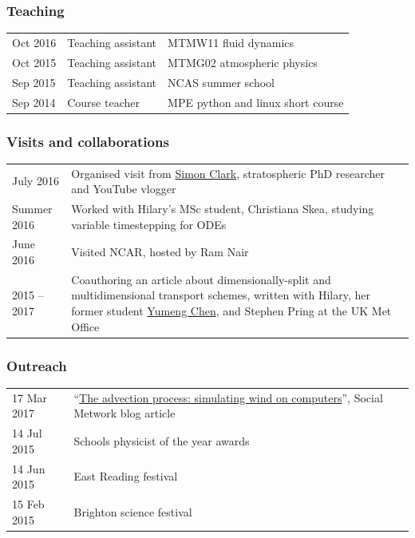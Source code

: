\documentclass[a4paper,11pt]{article}
\begin{document}
\subsubsection*{Teaching}
\begin{tabular}{l l l}
Oct 2016 & Teaching assistant & MTMW11 fluid dynamics \\
Oct 2015 & Teaching assistant & MTMG02 atmospheric physics \\
Sep 2015 & Teaching assistant & NCAS summer school \\
Sep 2014 & Course teacher & MPE python and linux short course \\
\end{tabular}

\subsubsection*{Visits and collaborations}
\begin{tabularx}{\linewidth}{l X}
July 2016 & Organised visit from \href{https://www.youtube.com/user/SimonOxfPhys}{Simon Clark}, stratospheric PhD researcher and YouTube vlogger \\
Summer 2016 & Worked with Hilary's MSc student, Christiana Skea, studying variable timestepping for ODEs \\
June 2016 & Visited NCAR, hosted by Ram Nair \\
2015 -- 2017 & Coauthoring an article about dimensionally-split and multidimensional transport schemes, written with Hilary, her former student \href{https://www.clisap.de/research/a:-climate-dynamics-and-variability/crg-numerical-methods-in-geosciences/team-members/yumeng-chen/}{Yumeng Chen}, and Stephen Pring at the UK Met Office \\
\end{tabularx}

\subsubsection*{Outreach}
\begin{tabular}{l l l}
17 Mar 2017 & ``\href{https://thesocialmetwork.wordpress.com/2017/03/17/simulating-wind-on-computers/}{The advection process: simulating wind on computers}'', Social Metwork blog article \\
14 Jul 2015 & Schools physicist of the year awards \\
14 Jun 2015 & East Reading festival \\
15 Feb 2015 & Brighton science festival \\
\end{tabular}
\end{document}
